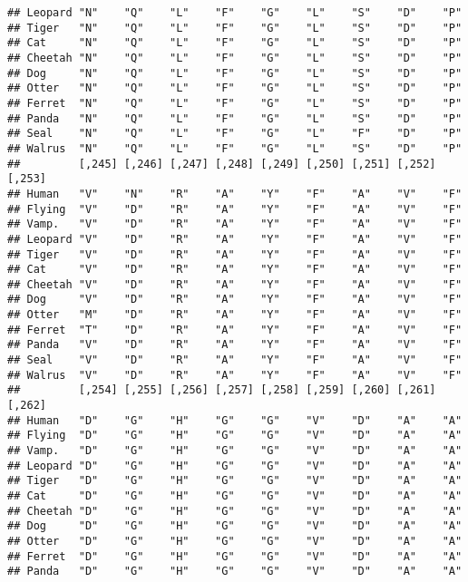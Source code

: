 \documentclass[]{article}
\begin{document}
\begin{verbatim}
## Leopard "N"    "Q"    "L"    "F"    "G"    "L"    "S"    "D"    "P"   
## Tiger   "N"    "Q"    "L"    "F"    "G"    "L"    "S"    "D"    "P"   
## Cat     "N"    "Q"    "L"    "F"    "G"    "L"    "S"    "D"    "P"   
## Cheetah "N"    "Q"    "L"    "F"    "G"    "L"    "S"    "D"    "P"   
## Dog     "N"    "Q"    "L"    "F"    "G"    "L"    "S"    "D"    "P"   
## Otter   "N"    "Q"    "L"    "F"    "G"    "L"    "S"    "D"    "P"   
## Ferret  "N"    "Q"    "L"    "F"    "G"    "L"    "S"    "D"    "P"   
## Panda   "N"    "Q"    "L"    "F"    "G"    "L"    "S"    "D"    "P"   
## Seal    "N"    "Q"    "L"    "F"    "G"    "L"    "F"    "D"    "P"   
## Walrus  "N"    "Q"    "L"    "F"    "G"    "L"    "S"    "D"    "P"   
##         [,245] [,246] [,247] [,248] [,249] [,250] [,251] [,252] [,253]
## Human   "V"    "N"    "R"    "A"    "Y"    "F"    "A"    "V"    "F"   
## Flying  "V"    "D"    "R"    "A"    "Y"    "F"    "A"    "V"    "F"   
## Vamp.   "V"    "D"    "R"    "A"    "Y"    "F"    "A"    "V"    "F"   
## Leopard "V"    "D"    "R"    "A"    "Y"    "F"    "A"    "V"    "F"   
## Tiger   "V"    "D"    "R"    "A"    "Y"    "F"    "A"    "V"    "F"   
## Cat     "V"    "D"    "R"    "A"    "Y"    "F"    "A"    "V"    "F"   
## Cheetah "V"    "D"    "R"    "A"    "Y"    "F"    "A"    "V"    "F"   
## Dog     "V"    "D"    "R"    "A"    "Y"    "F"    "A"    "V"    "F"   
## Otter   "M"    "D"    "R"    "A"    "Y"    "F"    "A"    "V"    "F"   
## Ferret  "T"    "D"    "R"    "A"    "Y"    "F"    "A"    "V"    "F"   
## Panda   "V"    "D"    "R"    "A"    "Y"    "F"    "A"    "V"    "F"   
## Seal    "V"    "D"    "R"    "A"    "Y"    "F"    "A"    "V"    "F"   
## Walrus  "V"    "D"    "R"    "A"    "Y"    "F"    "A"    "V"    "F"   
##         [,254] [,255] [,256] [,257] [,258] [,259] [,260] [,261] [,262]
## Human   "D"    "G"    "H"    "G"    "G"    "V"    "D"    "A"    "A"   
## Flying  "D"    "G"    "H"    "G"    "G"    "V"    "D"    "A"    "A"   
## Vamp.   "D"    "G"    "H"    "G"    "G"    "V"    "D"    "A"    "A"   
## Leopard "D"    "G"    "H"    "G"    "G"    "V"    "D"    "A"    "A"   
## Tiger   "D"    "G"    "H"    "G"    "G"    "V"    "D"    "A"    "A"   
## Cat     "D"    "G"    "H"    "G"    "G"    "V"    "D"    "A"    "A"   
## Cheetah "D"    "G"    "H"    "G"    "G"    "V"    "D"    "A"    "A"   
## Dog     "D"    "G"    "H"    "G"    "G"    "V"    "D"    "A"    "A"   
## Otter   "D"    "G"    "H"    "G"    "G"    "V"    "D"    "A"    "A"   
## Ferret  "D"    "G"    "H"    "G"    "G"    "V"    "D"    "A"    "A"   
## Panda   "D"    "G"    "H"    "G"    "G"    "V"    "D"    "A"    "A"   

\end{verbatim}
\end{document}
